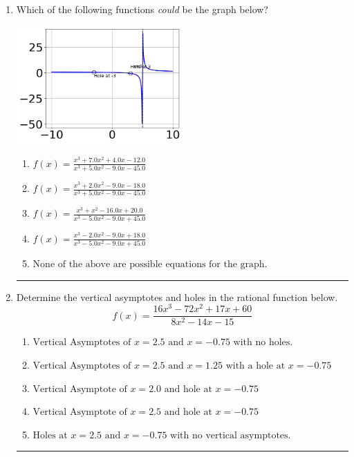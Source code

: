 \documentclass[14pt]{extbook}
\newcommand{\litem}[1]{\item#1\hspace*{-1cm}\rule{\textwidth}{0.4pt}}
\begin{document}
\begin{enumerate}
{\begin{enumerate}[label=\Alph*.]
\end{enumerate} }
\litem{
Which of the following functions \textit{could} be the graph below?
\begin{center}
    \includegraphics[width=0.5\textwidth]{../Figures/identifyGraphOfRationalFunctionA.png}
\end{center}
\begin{enumerate}[label=\Alph*.]
\item \( f(x)=\frac{x^{3} +7.0 x^{2} +4.0 x -12.0}{x^{3} +5.0 x^{2} -9.0 x -45.0} \)
\item \( f(x)=\frac{x^{3} +2.0 x^{2} -9.0 x -18.0}{x^{3} +5.0 x^{2} -9.0 x -45.0} \)
\item \( f(x)=\frac{x^{3} + x^{2} -16.0 x + 20.0}{x^{3} -5.0 x^{2} -9.0 x + 45.0} \)
\item \( f(x)=\frac{x^{3} -2.0 x^{2} -9.0 x + 18.0}{x^{3} -5.0 x^{2} -9.0 x + 45.0} \)
\item \( \text{None of the above are possible equations for the graph.} \)

\end{enumerate} }
\litem{
Determine the vertical asymptotes and holes in the rational function below.\[ f(x) = \frac{16x^{3} -72 x^{2} +17 x + 60}{8x^{2} -14 x -15} \]\begin{enumerate}[label=\Alph*.]
\item \( \text{Vertical Asymptotes of } x = 2.5 \text{ and } x = -0.75 \text{ with no holes.} \)
\item \( \text{Vertical Asymptotes of } x = 2.5 \text{ and } x = 1.25 \text{ with a hole at } x = -0.75 \)
\item \( \text{Vertical Asymptote of } x = 2.0 \text{ and hole at } x = -0.75 \)
\item \( \text{Vertical Asymptote of } x = 2.5 \text{ and hole at } x = -0.75 \)
\item \( \text{Holes at } x = 2.5 \text{ and } x = -0.75 \text{ with no vertical asymptotes.} \)


\end{enumerate}}
\end{enumerate}
\end{document}

